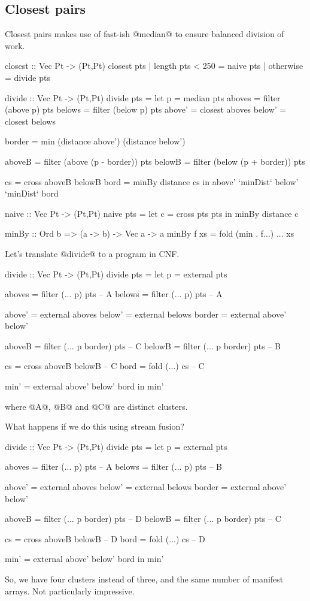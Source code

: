\subsection{Closest pairs}
Closest pairs makes use of fast-ish @median@ to ensure balanced division of work.
\begin{code}
closest :: Vec Pt -> (Pt,Pt)
closest pts
 | length pts < 250
 = naive pts
 | otherwise
 = divide pts

divide :: Vec Pt -> (Pt,Pt)
divide pts
 = let p      = median pts
       aboves = filter (above p) pts
       belows = filter (below p) pts
       above' = closest aboves
       below' = closest belows

       border = min (distance above') (distance below')

       aboveB = filter (above (p - border)) pts
       belowB = filter (below (p + border)) pts

       cs     = cross aboveB belowB
       bord   = minBy distance cs
   in  above' `minDist` below' `minDist` bord


naive :: Vec Pt -> (Pt,Pt)
naive pts
 = let c = cross pts pts
   in  minBy distance c

minBy :: Ord b => (a -> b) -> Vec a -> a
minBy f xs
 = fold (min . f...) ... xs
\end{code}

Let's translate @divide@ to a program in CNF.
\begin{code}
divide :: Vec Pt -> (Pt,Pt)
divide pts
 = let p      = external pts

       aboves = filter (... p) pts          -- A
       belows = filter (... p) pts          -- A

       above' = external aboves
       below' = external belows
       border = external above' below'

       aboveB = filter (... p border) pts   -- C
       belowB = filter (... p border) pts   -- B

       cs     = cross  aboveB belowB        -- C
       bord   = fold   (...) cs             -- C

       min'   = external above' below' bord
   in  min'
\end{code}
where @A@, @B@ and @C@ are distinct clusters.

What happens if we do this using stream fusion?
\begin{code}
divide :: Vec Pt -> (Pt,Pt)
divide pts
 = let p      = external pts

       aboves = filter (... p) pts          -- A
       belows = filter (... p) pts          -- B

       above' = external aboves
       below' = external belows
       border = external above' below'


       aboveB = filter (... p border) pts   -- D
       belowB = filter (... p border) pts   -- C

       cs     = cross  aboveB belowB        -- D
       bord   = fold   (...) cs             -- D

       min'   = external above' below' bord
   in  min'
\end{code}
So, we have four clusters instead of three, and the same number of manifest arrays. Not particularly impressive.


